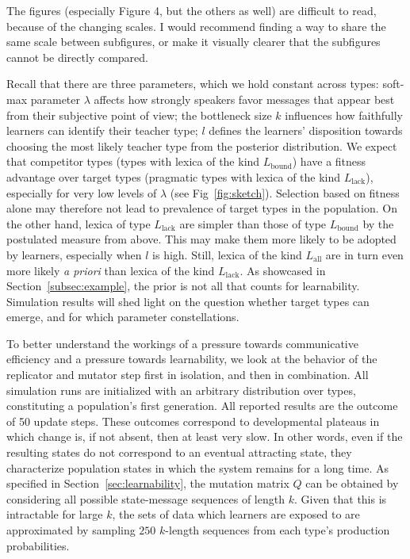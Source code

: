 \documentclass[a4paper, 11pt]{article}
\theoremstyle{Satz}
\newcommand{\hl}[1]{\textcolor[rgb]{.8,.33,.0}{#1}}%
\newcommand{\mylang}[1]{\ensuremath{L_{\text{#1}}}\xspace} %
\newcommand{\Lall}{\mylang{all}}
\newcommand{\Lbound}{\mylang{bound}}
\newcommand{\Llack}{\mylang{lack}}
\begin{document}
\hl{The figures (especially Figure 4, but the others as well) are difficult to read, because of the changing scales. I would recommend finding a way to share the same scale between subfigures, or make it visually clearer that the subfigures cannot be directly compared.}

Recall that there are three parameters, which we hold constant across types: soft-max parameter $\lambda$ affects how strongly
speakers favor messages that appear best from their subjective point of view; the
bottleneck size $k$ influences how faithfully learners can identify their teacher type; $l$
defines the learners' disposition towards choosing the most likely teacher type from the
posterior distribution. We expect that competitor types (types with lexica of the kind
$\Lbound$) have a fitness advantage over target types (pragmatic types with lexica of the kind
$\Llack$), especially for very low levels of $\lambda$ (see Fig~\ref{fig:sketch}). Selection based on fitness alone may
therefore not lead to prevalence of target types in the population. On the other hand, lexica
of type $\Llack$ are simpler than those of type $\Lbound$ by the postulated measure from
above. This may make them more likely to be adopted by learners, especially when $l$ is high. Still, lexica of the kind $\Lall$ are in turn even more likely \emph{a priori} than lexica of the kind $\Llack$. As showcased in Section~\ref{subsec:example}, the prior is not all that counts for learnability. Simulation results will shed light on the question whether target
types can emerge, and for which parameter constellations.

To better understand the workings of a pressure towards communicative efficiency and a pressure
towards learnability, we look at the behavior of the replicator and mutator step first in
isolation, and then in combination. All simulation runs are initialized with an arbitrary
distribution over types, constituting a population's first generation. All reported results are
the outcome of 50 update steps. These outcomes correspond to developmental plateaus in which
change is, if not absent, then at least very slow. In other words, even if the resulting states
do not correspond to an eventual attracting state, they characterize population states in which the system remains for a long time. As specified in Section~\ref{sec:learnability}, the
mutation matrix $Q$ can be obtained by considering all possible state-message sequences of
length $k$. Given that this is intractable for large $k$, the sets of data which learners are
exposed to are approximated by sampling $250$ $k$-length sequences from each type's production
probabilities.
\end{document}
